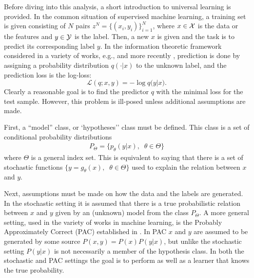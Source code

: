 \documentclass[conference,letterpaper]{IEEEtran}
\begin{document}
Before diving into this analysis, a short introduction to universal learning is provided. In the common situation of supervised machine learning, a training set is given consisting of $N$ pairs $z^N=\{(x_i, y_i)\}_{i=1}^{N}$, where $x \in {\cal X}$ is the data or the features and $y \in {\cal Y}$ is the label. Then, a new $x$ is given and the task is to predict its corresponding label $y$. 
In the information theoretic framework considered in a variety of works, e.g., \cite{universal_prediction} and more recently \cite{FogelFeder2018}, prediction is done by assigning a probability distribution $q(\cdot|x)$ to the unknown label, and the prediction loss is the log-loss:
\begin{equation}
\mathcal{L}(q;x,y) = -\log {q(y|x}).
\end{equation}
Clearly a reasonable goal is to find the predictor $q$ with the minimal loss for the test sample. However, this problem is ill-posed unless additional assumptions are made.

First, a ``model'' class, or `hypotheses'' class must be defined. This class is 
a set of conditional probability distributions
\begin{align} P_\Theta = \{ p_\theta(y|x),\;\;\theta\in\Theta\} \end{align} 
where $\Theta$ is a general index set. This is equivalent to saying that there is a set of stochastic functions  $\{ y=g_\theta(x),\;\;\theta\in\Theta\}$ used to explain the relation between $x$ and $y$.

Next, assumptions must be made on how the data and the labels are generated. In the stochastic setting it is assumed that
there is a true probabilistic relation between $x$ and $y$ given by an (unknown) model from the class $P_\Theta$. 
A more general setting, used in the variety of works in machine learning, is the 
Probably Approximately Correct (PAC) established in  \cite{valiant1984theory}. In PAC
$x$ and $y$ are assumed to be generated by some source $P(x,y)=P(x)P(y|x)$, but unlike the stochastic setting $P(y|x)$ is not necessarily a member of the hypothesis class. In both the stochastic and PAC settings the goal is to perform as well as a learner that knows the true probability.
\end{document}
